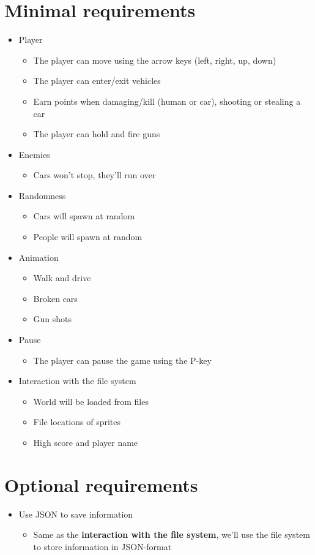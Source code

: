 \documentclass[12pt]{article}
\begin{document}
	\section{Minimal requirements}
	\begin{itemize}
		\item Player
			\begin{itemize}
				\item The player can move using the arrow keys (left, right, up, down)
				\item The player can enter/exit vehicles
				\item Earn points when damaging/kill (human or car), shooting or stealing a car
				\item The player can hold and fire guns
			\end{itemize}
		\item Enemies
			\begin{itemize}
				\item Cars won't stop, they'll run over
			\end{itemize}
		\item Randomness
			\begin{itemize}
				\item Cars will spawn at random
				\item People will spawn at random
			\end{itemize}
		\item Animation
			\begin{itemize}
				\item Walk and drive
				\item Broken cars
				\item Gun shots
			\end{itemize}
		\item Pause
			\begin{itemize}
				\item The player can pause the game using the P-key
			\end{itemize}
		\item Interaction with the file system
			\begin{itemize}
				\item World will be loaded from files
				\item File locations of sprites
				\item High score and player name
			\end{itemize}
	\end{itemize}

	\section{Optional requirements}
	\begin{itemize}
		\item Use JSON to save information
			\begin{itemize}
				\item Same as the \textbf{interaction with the file system}, we'll use the file system to store information in JSON-format 
			\end{itemize}
	\end{itemize}
\end{document}
